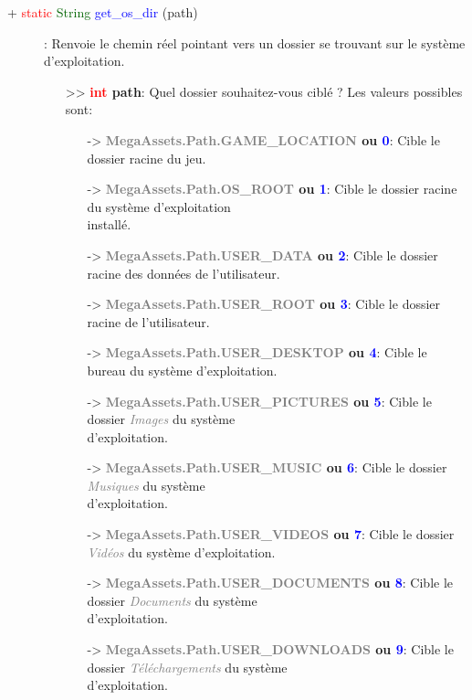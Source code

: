 \documentclass[a4paper, 11pt]{article}
\begin{document}
	\begin{description}
		\item [+ \textcolor{red}{static} \textcolor{darkgreen}{String} \textcolor{blue}{get\_os\_dir} 
		(path)]: Renvoie le chemin réel pointant vers un dossier se trouvant sur le système d'exploitation.
		\begin{itemize}
			\item[>> \textbf{\textcolor{red}{int} path}:] Quel dossier souhaitez-vous ciblé ? Les valeurs
			possibles sont:
			\begin{itemize}
				\item[-> \textbf{\textcolor{gray}{MegaAssets.Path.GAME\_LOCATION} ou \textcolor{blue}{0}}:] 
				Cible le dossier racine du jeu.
				\item[-> \textbf{\textcolor{gray}{MegaAssets.Path.OS\_ROOT} ou \textcolor{blue}{1}}:] Cible 
				le dossier racine du système d'exploitation \\installé.
				\item[-> \textbf{\textcolor{gray}{MegaAssets.Path.USER\_DATA} ou \textcolor{blue}{2}}:] 
				Cible le dossier racine des données de l'utilisateur.
				\item[-> \textbf{\textcolor{gray}{MegaAssets.Path.USER\_ROOT} ou \textcolor{blue}{3}}:] 
				Cible le dossier racine de l'utilisateur.
				\item[-> \textbf{\textcolor{gray}{MegaAssets.Path.USER\_DESKTOP} ou \textcolor{blue}{4}}:] 
				Cible le bureau du système d'exploitation.
				\item[-> \textbf{\textcolor{gray}{MegaAssets.Path.USER\_PICTURES} ou \textcolor{blue}{5}}:] 
				Cible le dossier \textcolor{gray}{\textit{Images}} du système \\d'exploitation.
				\item[-> \textbf{\textcolor{gray}{MegaAssets.Path.USER\_MUSIC} ou \textcolor{blue}{6}}:] 
				Cible le dossier \textcolor{gray}{\textit{Musiques}} du système \\d'exploitation.
				\item[-> \textbf{\textcolor{gray}{MegaAssets.Path.USER\_VIDEOS} ou \textcolor{blue}{7}}:] 
				Cible le dossier \textcolor{gray}{\textit{Vidéos}} du système d'exploitation.
				\item[-> \textbf{\textcolor{gray}{MegaAssets.Path.USER\_DOCUMENTS} ou \textcolor{blue}{8}}:] 
				Cible le dossier \textcolor{gray}{\textit{Documents}} du système \\d'exploitation.
				\item[-> \textbf{\textcolor{gray}{MegaAssets.Path.USER\_DOWNLOADS} ou \textcolor{blue}{9}}:] 
				Cible le dossier \textcolor{gray}{\textit{Téléchargements}} du système \\d'exploitation.\\
			\end{itemize}
		\end{itemize}
	\end{description}
\end{document}
